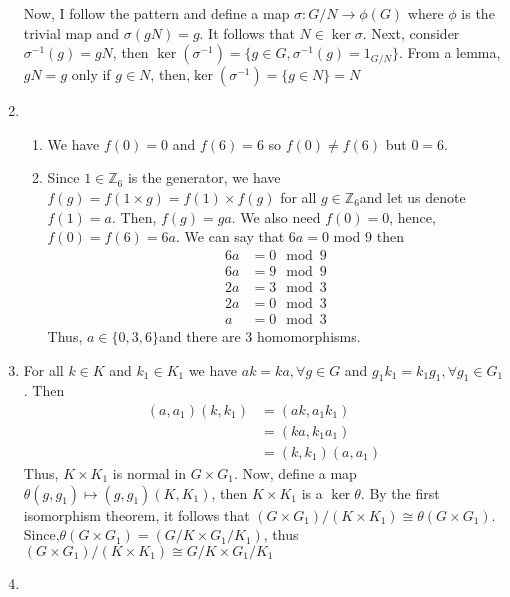 \documentclass[]{article}
\begin{document}
\begin{enumerate}
Now, I follow the pattern and define a map $\sigma: G/N \rightarrow \phi(G)$ where $\phi$ is the trivial map and $\sigma(gN) = g$. It follows that $N \in \ker \sigma$. Next, consider $\sigma^{-1} (g) = gN$, then $\ker (\sigma^{-1}) = \{g \in G, \sigma^{-1} (g) = 1_{G/N}\}$. From a lemma, $gN = g$ only if $g \in N$, then,$ \ker (\sigma^{-1}) = \{g \in N\} = N$
\item \begin{enumerate}[label = \arabic*)]
    \item We have $f(0) = 0$ and $f(6) = 6$ so $f(0) \neq f(6)$ but $0 = 6$.
 \item Since $1 \in \mathbb{Z}_6$ is the generator, we have $f(g) = f(1\times g) = f(1) \times f(g)$ for all $g \in \mathbb{Z}_6 $and let us denote $f(1) = a$. Then, $f(g) = ga$. We also need $f(0) = 0$, hence, $f(0) = f(6) = 6a$. We can say that $6a = 0$ mod $9$ then \begin{align*}
        6a &= 0 \mod{9}\\
        6a &= 9 \mod{9}\\
        2a &= 3 \mod{3}\\
        2a &= 0 \mod{3}\\
        a &= 0 \mod{3}
    \end{align*} Thus, $a\in \{0,3,6\} $and there are 3 homomorphisms.
\end{enumerate}
\item For all $k \in K$ and $k_1 \in K_1$ we have $ak = ka , \forall g \in G$ and $g_1k_1 = k_1g_1, \forall g_1 \in G_1$. Then \begin{align*}
    (a,a_1)(k,k_1) &= (ak,a_1k_1)\\
    &= (ka,k_1a_1)\\
    &= (k,k_1)(a,a_1)
\end{align*} Thus, $K\times K_1$ is normal in $G\times G_1$. Now, define a map $\theta(g,g_1) \mapsto (g,g_1)(K,K_1)$, then $K \times K_1$ is a $\ker \theta$. By the first isomorphism theorem, it follows that $(G\times G_1) / (K\times K_1) \cong \theta(G\times G_1)$. Since,$ \theta(G\times G_1) = (G/K \times G_1/K_1)$, thus $(G\times G_1) / (K\times K_1) \cong G/K \times G_1/K_1$
\item 
\end{enumerate}
\end{document}

